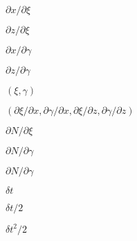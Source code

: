 \documentclass{article}
\begin{document}
$ \partial x/\partial \xi $
\pagebreak

$ \partial z/\partial \xi $
\pagebreak

$ \partial x/\partial \gamma $
\pagebreak

$ \partial z/\partial \gamma $
\pagebreak

$ (\xi,
\gamma) $
\pagebreak

$ (\partial \xi/ \partial x, \partial \gamma/ \partial x,
\partial \xi/ \partial z, \partial \gamma/ \partial z) $
\pagebreak

$ \partial N/\partial \xi $
\pagebreak

$ \partial N/\partial
\gamma $
\pagebreak

$ \partial N/\partial \gamma
$
\pagebreak

$ \delta t $
\pagebreak

$ \delta t / 2 $
\pagebreak

$ \delta t^2 / 2 $
\pagebreak
\end{document}
